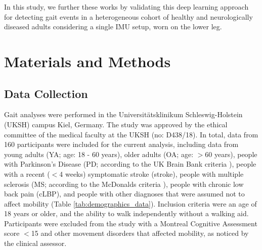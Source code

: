 \documentclass[sensors,article,submit,pdftex,moreauthors]{Definitions/mdpi}
\begin{document}
In this study, we further these works by validating this deep learning approach for detecting gait events in a heterogeneous cohort of healthy and neurologically diseased adults considering a single IMU setup, worn on the lower leg.
\section{Materials and Methods}

\subsection{Data Collection}
Gait analyses were performed in the Universit\"{a}tsklinikum Schleswig-Holstein (UKSH) campus Kiel, Germany. The study \cite{Warmerdam2021} was approved by the ethical committee of the medical faculty at the UKSH (no: D438/18). In total, data from 160 participants were included for the current analysis, including data from young adults (YA; age: 18 - 60 years), older adults (OA; age: $>$60 years), people with Parkinson's Disease (PD; according to the UK Brain Bank criteria \cite{Gibb1988}), people with a recent ($<$4 weeks) symptomatic stroke (stroke), people with multiple sclerosis (MS; according to the McDonalds criteria \cite{Thompson2018}), people with chronic low back pain (cLBP), and people with other diagnoses that were assumed not to affect mobility (Table \ref{tab:demographics_data}). Inclusion criteria were an age of 18 years or older, and the ability to walk independently without a walking aid. Participants were excluded from the study with a Montreal Cognitive Assessment \cite{Nasreddine2005} score $<$15 and other movement disorders that affected mobility, as noticed by the clinical assessor.
\end{document}
